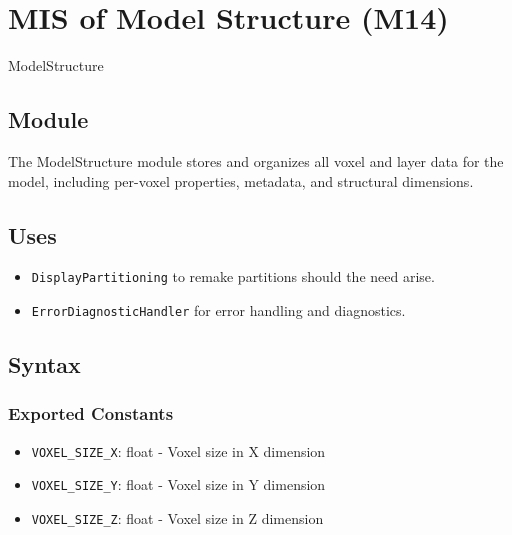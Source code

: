 \documentclass[12pt, titlepage]{article}
\begin{document}
\newpage


\section{MIS of Model Structure (M14)}\label{Module17}

ModelStructure

\subsection{Module}

The ModelStructure module stores and organizes all voxel and layer data for the model, including per-voxel properties, metadata, and structural dimensions.

\subsection{Uses}
\begin{itemize}
  \item \texttt{DisplayPartitioning} to remake partitions should the need arise.
  \item \texttt{ErrorDiagnosticHandler} for error handling and diagnostics.
\end{itemize}

\subsection{Syntax}

\subsubsection{Exported Constants}
\begin{itemize}
  \item \texttt{VOXEL\_SIZE\_X}: float - Voxel size in X dimension
  \item \texttt{VOXEL\_SIZE\_Y}: float - Voxel size in Y dimension
  \item \texttt{VOXEL\_SIZE\_Z}: float - Voxel size in Z dimension
\end{itemize}
\end{document}
